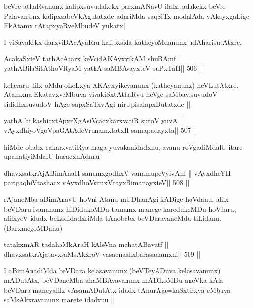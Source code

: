 \begin{artha}
beVre athaRvanunx kalipxsuvudakekx parxmANavU ilalx, adakekx beVre
PalavanUnx kalipxsabeVkAgutatxde adariMda saqSiTx modalAda
vAkayxgaLige EkAtamx tAtapxyaRveMbudeV yukatx||

I viSayakekx darxviDAcAyaRru kalipxsida katheyoMdanunx udAharisutAtxre.
\end{artha}

\begin{shl}
AcakaSxteV tathAcAtarx keVcidAKAyxyikAM shuBAmf ||
yathABilaSitAthoVR\s yaM yathA saMBAvayxteV suPxTaH\hfill || 506 ||
\end{shl}

\begin{artha}
kelavaru ililx oMdu oLeLxya AKAyxyikeyanunx (katheyanunx)
heVLutAtxre. Atamxna EkatavxveMbuva vivakiSxtAthaRvu heVge
saMbavisuvudoV sididhxsuvudoV hAge sapxSaTxvAgi nirUpisalapxDutatxde ||
\end{artha}

\begin{shl}
yathA hi kashicxtApxrXgAsiVcacxkarxvatiR sutoV yuvA ||
vAyxdhiyoVgoVpaGAtAdeVrunamxtatxH samapadayxta\hfill || 507 ||
\end{shl}

\begin{artha}
hiMde obabx cakarxvatiRya maga yuvakanidadxnu, avanu roVgadiMdalU
itare upahatiyiMdalU hucacxnAdanu
\end{artha}

\begin{shl}
dhavxsatxrAjABimAnaH sanumxgodhxV vanamupeVyivAnf ||
vAyxdheYH parigaqhiVtashacx vAyxdhoV\s simxVtayxBimanayxteV\hfill || 508 ||
\end{shl}

\begin{artha}
rAjaneMba aBimAnavU hoVni Atanu mUDhanAgi kADige hoVdanu, alilx
beVDaru ivananunx hiDidukoMDu tamamx manege karedukoMDu hoVdaru,
alilxyeV idudx beLadidadxriMda tAnobabx beVDaravaneMdu tiLidanu. (BarxmegoMDanu)
\end{artha}

\begin{shl}
tatakxmAR tadahaMkAraH kAleVna mahatA\s Bavatf ||
dhavxsatxrAjatavxsaMsAkxroV vasacnashxbarasadamxni\hfill || 509 ||
\end{shl}

\begin{artha}
I aBimAnadiMda beVDara kelasavanunx (beVTeyADuva kelasavanunx)
mADutAtx, beVDaneMba ahaMBAvavanunx mADikoMDu aneVka kAla beVDara
maneyalilx vAsamADutAtx idudx tAnurAja=kaSxtirxya eMbuva
saMsAkxravanunx marete idadxnu ||
\end{artha}

